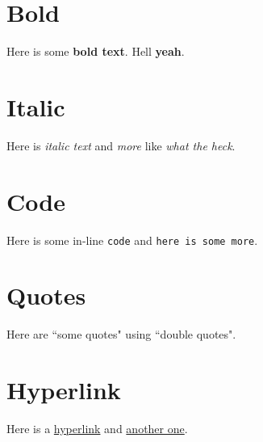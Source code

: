 \documentclass[10pt]{extarticle}
\date{}
\begin{document}

\section{Bold}

Here is some \textbf{bold text}. Hell \textbf{yeah}.

\section{Italic}

Here is \textit{italic text} and \textit{more} like \textit{what the heck}.

\section{Code}

Here is some in-line \texttt{code} and \texttt{here is some more}.

\section{Quotes}

Here are ``some quotes" using ``double quotes".

\section{Hyperlink}

Here is a \href{http://github.com}{hyperlink} and \href{https://google.com}{another one}.

\end{document}
